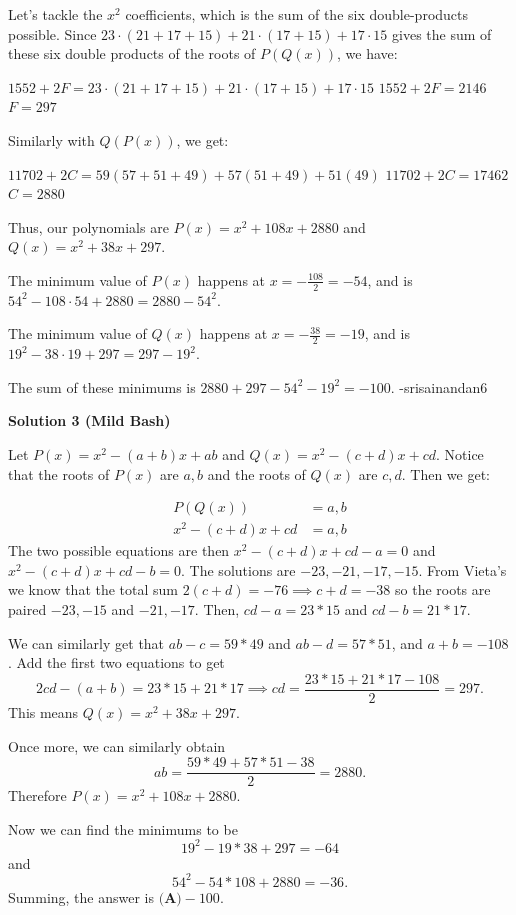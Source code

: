 \begin{enumerate}
 Let's tackle the $x^2$ coefficients, which is the sum of the six double-products possible. Since $23 \cdot (21 + 17 + 15) + 21 \cdot (17 + 15) + 17 \cdot 15$ gives the sum of these six double products of the roots of $P(Q(x))$, we have:

 $1552 + 2F = 23 \cdot (21 + 17 + 15) + 21 \cdot (17 + 15) + 17 \cdot 15$
$1552 + 2F = 2146$
$F = 297$

 Similarly with $Q(P(x))$, we get:

 $11702 + 2C = 59(57 + 51 + 49) + 57(51 + 49) + 51(49)$
$11702 + 2C = 17462$
$C = 2880$

 Thus, our polynomials are $P(x) = x^2 + 108x + 2880$ and $Q(x) = x^2 + 38x + 297$.

 The minimum value of $P(x)$ happens at $x = -\frac{108}{2} = -54$, and is $54^2 - 108 \cdot 54 + 2880 = 2880 - 54^2$.

 The minimum value of $Q(x)$ happens at $x = -\frac{38}{2} = -19$, and is $19^2 - 38 \cdot 19 + 297 = 297 - 19^2$.

 The sum of these minimums is $2880 +297 - 54^2 - 19^2 = \boxed{-100}$. -srisainandan6

 



\textbf{Solution 3 (Mild Bash)}

Let $P(x) = x^2 - (a+b)x + ab$ and $Q(x) = x^2 - (c+d)x + cd$. Notice that the roots of $P(x)$ are $a,b$ and the roots of $Q(x)$ are $c,d.$ Then we get:

 
 \begin{align*} P(Q(x)) &= a, b \\ x^2 - (c+d)x + cd &= a, b \end{align*}
The two possible equations are then $x^2 - (c+d)x + cd-a=0$ and $x^2 - (c+d)x + cd-b=0$. The solutions are $-23, -21, -17, -15$. From Vieta's we know that the total sum $2(c+d) = -76 \implies c+d = -38$ so the roots are paired $-23, -15$ and $-21, -17$. Then, $cd - a = 23*15$ and $cd - b = 21*17$.

 We can similarly get that $ab - c = 59*49$ and $ab - d = 57*51$, and $a+b = -108$. Add the first two equations to get 
 \[2cd - (a+b) = 23*15 + 21*17 \implies cd = \frac{23*15+21*17 - 108}{2} = 297.\] This means $Q(x) = x^2 + 38x + 297$.

 Once more, we can similarly obtain 
 \[ab = \frac{59*49 + 57*51 - 38}{2} = 2880.\] Therefore $P(x) = x^2 + 108x + 2880$.

 Now we can find the minimums to be 
 \[19^2 - 19*38 + 297 = -64\] and 
 \[54^2 - 54*108 + 2880 = -36.\] Summing, the answer is $\boxed{\textbf{(A)} -100}.$





\end{enumerate}
